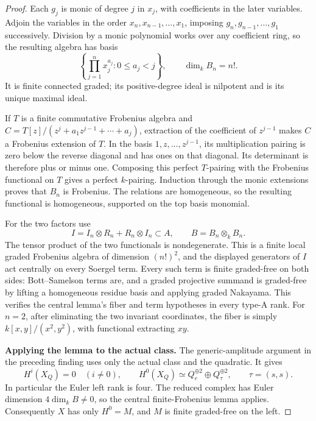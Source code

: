 \begin{proof}
Each \(g_j\) is monic of degree \(j\) in \(x_j\), with
coefficients in the later variables. Adjoin the variables in
the order \(x_n,x_{n-1},\ldots,x_1\), imposing
\(g_n,g_{n-1},\ldots,g_1\) successively.
Division by a monic polynomial works over any coefficient
ring, so the resulting algebra has basis
\[
 \left\{\prod_{j=1}^n x_j^{a_j}:0\le a_j<j\right\},
 \qquad \dim_k B_n=n!.
\]
It is finite connected graded; its positive-degree ideal is
nilpotent and is its unique maximal ideal.

If \(T\) is a finite commutative Frobenius algebra and
\(C=T[z]/(z^j+a_1z^{j-1}+\cdots+a_j)\), extraction of
the coefficient of \(z^{j-1}\) makes \(C\) a Frobenius
extension of \(T\). In the basis \(1,z,\ldots,z^{j-1}\),
its multiplication pairing is zero below the reverse
diagonal and has ones on that diagonal. Its determinant is
therefore plus or minus one. Composing this perfect
\(T\)-pairing with the Frobenius functional on \(T\)
gives a perfect \(k\)-pairing. Induction through the monic
extensions proves that \(B_n\) is Frobenius. The relations
are homogeneous, so the resulting functional is homogeneous,
supported on the top basis monomial.

For the two factors use
\[
 I=I_n\otimes R_n+R_n\otimes I_n\subset A,
 \qquad B=B_n\otimes_k B_n.
\]
The tensor product of the two functionals is nondegenerate.
This is a finite local graded Frobenius algebra of dimension
\((n!)^2\), and the displayed generators of \(I\) act
centrally on every Soergel term. Every such term is finite
graded-free on both sides: Bott--Samelson terms are, and a
graded projective summand is graded-free by lifting a
homogeneous residue basis and applying graded Nakayama.
This verifies the central lemma's fiber and term hypotheses
in every type-A rank. For \(n=2\), after eliminating the
two invariant coordinates, the fiber is simply
\(k[x,y]/(x^2,y^2)\), with functional extracting \(xy\).

\par\smallskip\noindent\textbf{Applying the lemma to the actual class.}\quad
The generic-amplitude argument in the preceding finding
uses only the actual class and the quadratic. It gives
\begin{equation}\label{eq:boundedSoergelgenericsupport}
 H^i(X_Q)=0\quad(i\ne0),\qquad
 H^0(X_Q)\simeq Q_e^{\oplus2}\oplus Q_\tau^{\oplus2},
 \qquad\tau=(s,s).
\end{equation}
In particular the Euler left rank is four. The reduced
complex has Euler dimension \(4\dim_kB\ne0\), so the
central finite-Frobenius lemma applies. Consequently
\(X\) has only \(H^0=M\), and \(M\) is finite
graded-free on the left.


\end{proof}
